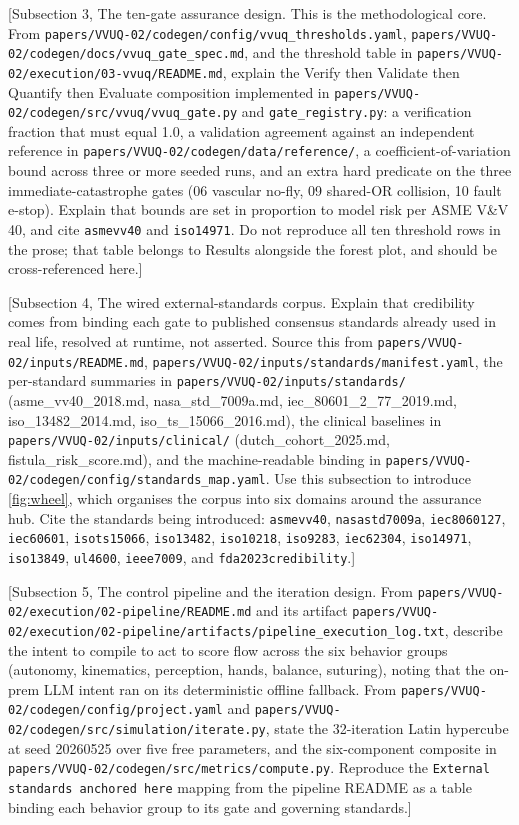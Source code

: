 [Subsection 3, The ten-gate assurance design. This is the methodological core.
From \texttt{papers/VVUQ-02/codegen/config/vvuq\_thresholds.yaml},
\texttt{papers/VVUQ-02/codegen/docs/vvuq\_gate\_spec.md}, and the threshold table in
\texttt{papers/VVUQ-02/execution/03-vvuq/README.md}, explain the Verify then
Validate then Quantify then Evaluate composition implemented in
\texttt{papers/VVUQ-02/codegen/src/vvuq/vvuq\_gate.py} and
\texttt{gate\_registry.py}: a verification fraction that must equal 1.0, a
validation agreement against an independent reference in
\texttt{papers/VVUQ-02/codegen/data/reference/}, a coefficient-of-variation bound
across three or more seeded runs, and an extra hard predicate on the three
immediate-catastrophe gates (06 vascular no-fly, 09 shared-OR collision, 10 fault
e-stop). Explain that bounds are set in proportion to model risk per ASME V\&V 40,
and cite \texttt{asmevv40} and \texttt{iso14971}. Do not reproduce all ten
threshold rows in the prose; that table belongs to Results alongside the forest
plot, and should be cross-referenced here.]

[Subsection 4, The wired external-standards corpus. Explain that credibility comes
from binding each gate to published consensus standards already used in real life,
resolved at runtime, not asserted. Source this from
\texttt{papers/VVUQ-02/inputs/README.md},
\texttt{papers/VVUQ-02/inputs/standards/manifest.yaml}, the per-standard summaries
in \texttt{papers/VVUQ-02/inputs/standards/} (asme\_vv40\_2018.md,
nasa\_std\_7009a.md, iec\_80601\_2\_77\_2019.md, iso\_13482\_2014.md,
iso\_ts\_15066\_2016.md), the clinical baselines in
\texttt{papers/VVUQ-02/inputs/clinical/} (dutch\_cohort\_2025.md,
fistula\_risk\_score.md), and the machine-readable binding in
\texttt{papers/VVUQ-02/codegen/config/standards\_map.yaml}. Use this subsection to
introduce \autoref{fig:wheel}, which organises the corpus into six domains around
the assurance hub. Cite the standards being introduced: \texttt{asmevv40},
\texttt{nasastd7009a}, \texttt{iec8060127}, \texttt{iec60601},
\texttt{isots15066}, \texttt{iso13482}, \texttt{iso10218}, \texttt{iso9283},
\texttt{iec62304}, \texttt{iso14971}, \texttt{iso13849}, \texttt{ul4600},
\texttt{ieee7009}, and \texttt{fda2023credibility}.]

[Subsection 5, The control pipeline and the iteration design. From
\texttt{papers/VVUQ-02/execution/02-pipeline/README.md} and its artifact
\texttt{papers/VVUQ-02/execution/02-pipeline/artifacts/pipeline\_execution\_log.txt},
describe the intent to compile to act to score flow across the six behavior groups
(autonomy, kinematics, perception, hands, balance, suturing), noting that the
on-prem LLM intent ran on its deterministic offline fallback. From
\texttt{papers/VVUQ-02/codegen/config/project.yaml} and
\texttt{papers/VVUQ-02/codegen/src/simulation/iterate.py}, state the 32-iteration
Latin hypercube at seed 20260525 over five free parameters, and the six-component
composite in \texttt{papers/VVUQ-02/codegen/src/metrics/compute.py}. Reproduce the
\texttt{External standards anchored here} mapping from the pipeline README as a
table binding each behavior group to its gate and governing standards.]


